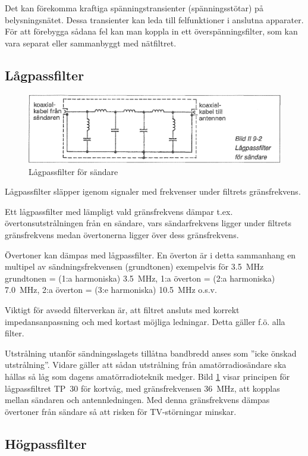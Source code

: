 Det kan förekomma kraftiga spänningstransienter (spänningsstötar) på
belysningsnätet. Dessa transienter kan leda till felfunktioner i anslutna
apparater. För att förebygga sådana fel kan man koppla in ett
överspänningsfilter, som kan vara separat eller sammanbyggt med nätfiltret.

\subsection{Lågpassfilter}

\begin{figure}
  \includegraphics[width=\textwidth]{images/bild_2_9-02}
  \caption{Lågpassfilter för sändare}
  \label{fig:bildII9-2}
\end{figure}

Lågpassfilter släpper igenom signaler med frekvenser under filtrets
gränsfrekvens.

Ett lågpassfilter med lämpligt vald gränsfrekvens dämpar t.ex.
övertonsutstrålningen från en sändare, vars sändarfrekvens ligger under filtrets
gränsfrekvens medan övertonerna ligger över dess gränsfrekvens.

Övertoner kan dämpas med lågpassfilter. En överton är i detta sammanhang en
multipel av sändningsfrekvensen (grundtonen) exempelvis för 3.5~MHz
grundtonen = (1:a harmoniska) 3.5~MHz, 1:a överton = (2:a harmoniska) 7.0~MHz,
2:a överton = (3:e harmoniska) 10.5~MHz o.s.v.

Viktigt för avsedd filterverkan är, att filtret ansluts med korrekt
impedansanpassning och med kortast möjliga ledningar. Detta gäller
f.ö. alla filter.

Utstrålning utanför sändningsslagets tillåtna bandbredd anses som
''icke önskad utstrålning''. Vidare gäller att sådan utstrålning från
amatörradiosändare ska hållas så låg som dagens amatörradioteknik medger.
Bild \ref{fig:bildII9-2} visar principen för lågpassfiltret TP~30 för kortvåg,
med gränsfrekvensen 36~MHz, att kopplas mellan sändaren och antennledningen.
Med denna gränsfrekvens dämpas övertoner från sändare så att risken för
TV-störningar minskar.

\subsection{Högpassfilter}

